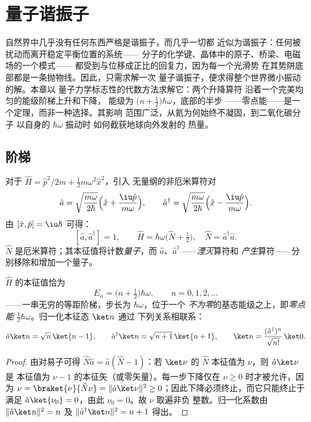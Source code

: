 \chapter{量子谐振子}\label{ch:b3:harmonic-oscillator}

自然界中几乎没有任何东西严格是谐振子，而几乎一切都
近似为谐振子：任何被扰动而离开稳定平衡位置的系统——
分子的化学键、晶体中的原子、桥梁、电磁场的一个模式——
都受到与位移成正比的回复力，因为每一个光滑势
在其势阱底部都是一条抛物线。因此，只需求解一次
量子谐振子，便求得整个世界微小振动的解。本章以
量子力学标志性的代数方法求解它：两个升降算符
沿着一个完美均匀的能级阶梯上升和下降，
能级为 $\big(n +
\tfrac12\big)\hbar\omega$，底部的半步
——零点能——是一个定理，而非一种选择。其影响
范围广泛，从氦为何始终不凝固，到二氧化碳分子
以自身的 $\hbar\omega$ 振动时
如何截获地球向外发射的
热量。

\section{阶梯}

\begin{definition}[升降算符]\label{def:b3:harmonic-oscillator:ladder}
对于 $\hat H = \hat p^2/2m + \tfrac12 m\omega^2\hat x^2$，引入
无量纲的非厄米算符对
\[
\hat a = \sqrt{\frac{m\omega}{2\hbar}}\Big(\hat x +
\frac{\iu\hat p}{m\omega}\Big) , \qquad
\hat a^\dagger = \sqrt{\frac{m\omega}{2\hbar}}\Big(\hat x -
\frac{\iu\hat p}{m\omega}\Big) .
\]
由 $[\hat x, \hat p] = \iu\hbar$ 可得：
\[
[\hat a, \hat a^\dagger] = 1 , \qquad
\hat H = \hbar\omega\Big(\hat N + \tfrac12\Big) , \quad
\hat N = \hat a^\dagger\hat a .
\]
$\hat N$ 是厄米算符；其本征值将计数\emph{量子}，而
$\hat a$、$\hat a^\dagger$——\emph{湮灭}算符和
\emph{产生}算符——分别移除和增加一个量子。
\end{definition}

\begin{theorem}[仅由代数得到的谱]\label{thm:b3:harmonic-oscillator:spectrum}
$\hat H$ 的本征值恰为
\[
E_n = \Big(n + \tfrac12\Big)\hbar\omega , \qquad n = 0, 1, 2, \dots
\]
——一串无穷的等距阶梯，步长为 $\hbar\omega$，位于一个
\emph{不为零}的基态能级之上，即\emph{零点能}
$\tfrac12\hbar\omega$。归一化本征态 $\ket n$ 通过
下列关系相联系：
\[
\hat a\ket n = \sqrt n\,\ket{n - 1} , \qquad
\hat a^\dagger\ket n = \sqrt{n + 1}\,\ket{n + 1} ,
\qquad
\ket n = \frac{(\hat a^\dagger)^n}{\sqrt{n!}}\,\ket0 .
\]
\end{theorem}

\begin{proof}
由对易子可得 $\hat N\hat a = \hat a(\hat N - 1)$：若
$\ket\nu$ 的 $\hat N$ 本征值为 $\nu$，则 $\hat a\ket\nu$ 是
本征值为 $\nu - 1$ 的本征矢（或零矢量）。每一步下降仅在
$\nu \ge 0$ 时才被允许，因为 $\nu = \braket{\nu}{\hat
N\nu} = \|\hat a\ket\nu\|^2 \ge 0$；因此下降必须终止，而它只能终止于
满足 $\hat a\ket{\nu_0}
= 0$，由此 $\nu_0 = 0$。故 $\nu$ 取遍非负
整数。归一化系数由 $\|\hat a\ket n\|^2 = n$
及 $\|\hat a^\dagger\ket n\|^2 = n + 1$ 得出。
\end{proof}

